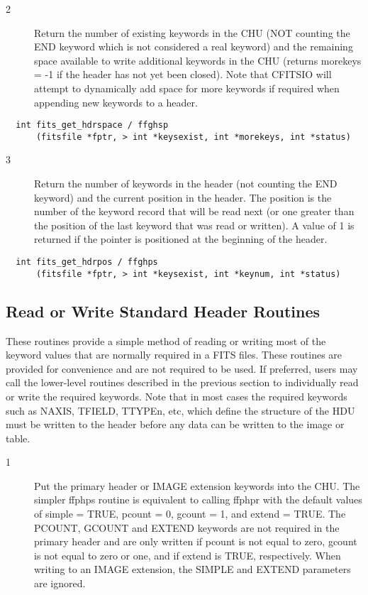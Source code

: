 \begin{description}
\item[2 ] Return the number of existing keywords in the CHU (NOT counting the
    END keyword which is not considered a real keyword) and the remaining
    space available to write additional keywords in the CHU (returns
    morekeys = -1 if the header has not yet been closed).
    Note that CFITSIO will attempt to dynamically add space for more
   keywords if required when appending new keywords to a header.
\end{description}

\begin{verbatim}
  int fits_get_hdrspace / ffghsp
      (fitsfile *fptr, > int *keysexist, int *morekeys, int *status)
\end{verbatim}

\begin{description}
\item[3 ] Return the number of keywords in the header (not counting the END
    keyword) and the current position
    in the header.  The position is the number of the keyword record that
    will be read next (or one greater than the position of the last keyword
    that was read or written). A value of 1 is returned if the pointer is
   positioned at the beginning of the header.
\end{description}

\begin{verbatim}
  int fits_get_hdrpos / ffghps
      (fitsfile *fptr, > int *keysexist, int *keynum, int *status)
\end{verbatim}

\subsection{ Read or Write Standard Header Routines \label{FFPHPS}}

These routines provide a simple method of reading or writing most of
the keyword values that are normally required in a FITS files.  These
routines are provided for convenience and are not required to
be used.  If preferred, users may call the lower-level routines
described in the previous section to individually read or write the
required keywords.  Note that in most cases the required keywords such
as NAXIS, TFIELD, TTYPEn, etc, which define the structure of the HDU
must be written to the header before any data can be written to the
image or table.


\begin{description}
\item[1 ] Put the primary header or IMAGE extension keywords into the CHU.
The simpler ffphps routine is equivalent to calling ffphpr with the
default values of simple = TRUE, pcount = 0, gcount = 1, and extend =
TRUE.  The PCOUNT, GCOUNT and EXTEND keywords are not required in the
primary header and are only written if pcount is not equal to zero,
gcount is not equal to zero or one, and if extend is TRUE,
respectively.  When writing to an IMAGE extension, the SIMPLE and
 EXTEND parameters are ignored.
\end{description}


